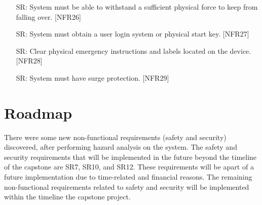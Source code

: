\documentclass{article}
\newcounter{srreqnum} %
\begin{document}
\begin{itemize}
    \item[SR\refstepcounter{srreqnum}\thesrreqnum \label{SR9}:]
    System must be able to withstand a sufficient physical force to keep from falling over. [NFR26]
    \item[SR\refstepcounter{srreqnum}\thesrreqnum \label{SR10}:]
    System must obtain a user login system or physical start key. [NFR27]
    \item[SR\refstepcounter{srreqnum}\thesrreqnum \label{SR11}:]
    Clear physical emergency instructions and labels located on the device. [NFR28]
    \item[SR\refstepcounter{srreqnum}\thesrreqnum \label{SR12}:]
    System must have surge protection. [NFR29]
\end{itemize}

\section{Roadmap}

There were some new non-functional requirements (safety and security) discovered, 
after performing hazard analysis on the system. The safety and security requirements 
that will be implemented in the future beyond the timeline of the capstone are SR7, 
SR10, and SR12. These requirements will be apart of a future implementation due to 
time-related and financial reasons. The remaining non-functional requirements related 
to safety and security will be implemented within the timeline the capstone project.
\end{document}
